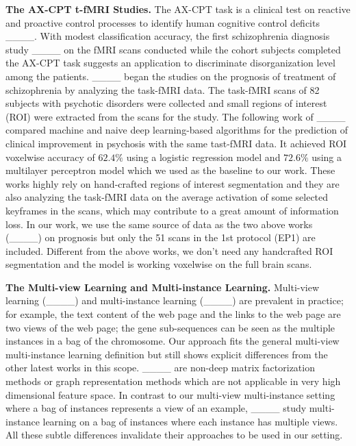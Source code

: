 \textbf{The AX-CPT t-fMRI Studies.}\label{sec:6.3} The AX-CPT task is a clinical test on reactive and proactive control processes to identify human cognitive control deficits ____. With modest classification accuracy, the first schizophrenia diagnosis study ____ on the fMRI scans conducted while the cohort subjects completed the AX-CPT task suggests an application to discriminate disorganization level among the patients. ____ began the studies on the prognosis of treatment of schizophrenia by analyzing the task-fMRI data. The task-fMRI scans of 82 subjects with psychotic disorders were collected and small regions of interest (ROI) were extracted from the scans for the study. The following work of ____ compared machine and naive deep learning-based algorithms for the prediction of clinical improvement in psychosis with the same tast-fMRI data. It achieved ROI voxelwise accuracy of $62.4\%$ using a logistic regression model and $72.6\%$ using a multilayer perceptron model which we used as the baseline to our work. These works highly rely on hand-crafted regions of interest segmentation and they are also analyzing the task-fMRI data on the average activation of some selected keyframes in the scans, which may contribute to a great amount of information loss. In our work, we use the same source of data \footnotemark as the two above works (____) on prognosis but only the 51 scans in the 1st protocol (EP1) are included. Different from the above works, we don't need any handcrafted ROI segmentation and the model is working voxelwise on the full brain scans. 


\textbf{The Multi-view Learning and Multi-instance Learning.}\label{sec:6.4} Multi-view learning (____) and multi-instance learning (____) are prevalent in practice; for example, the text content of the web page and the links to the web page are two views of the web page; the gene sub-sequences can be seen as the multiple instances in a bag of the chromosome. Our approach fits the general multi-view multi-instance learning definition but still shows explicit differences from the other latest works in this scope. ____ are non-deep matrix factorization methods or graph representation methods which are not applicable in very high dimensional feature space. In contrast to our multi-view multi-instance setting where a bag of instances represents a view of an example, ____ study multi-instance learning on a bag of instances where each instance has multiple views. All these subtle differences invalidate their approaches to be used in our setting.